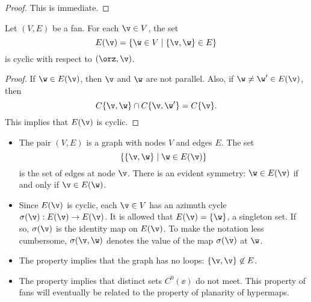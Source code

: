 \begin{proof} This is immediate.
\end{proof}

\begin{lemma}  
Let $(V,E)$ be a fan.
For each $\v\in V$, the set
\begin{displaymath}
E(\v) = \{\w\in V\mid \{\v,\w\}\in E\}
\end{displaymath}
is cyclic with respect to $(\orz,\v)$.
\end{lemma}
%

\begin{proof}  If $\w\in E(\v)$, then $\v$ and $\w$ are not parallel.
Also, if $\w\ne \w'\in E(\v)$, then
\begin{displaymath}
C\{\v,\w\}\cap C\{\v,\w'\} = C\{\v\}.
\end{displaymath}
This implies that $E(\v)$ is cyclic.
\end{proof}

\begin{remark}\label{rem:fan}
\begin{itemize}
\item The pair $(V,E)$ is a graph with nodes $V$ and edges $E$.  The set
\begin{displaymath}\{\{\v,\w\}\mid \w\in E(\v)\}\end{displaymath} is
the set of edges at node $\v$.  There is an evident symmetry: $\w\in
E(\v)$ if and only if $\v\in E(\w)$.
%
\item
{}
Since $E(\v)$ is cyclic,
each $\v\in V$ has an azimuth cycle $\sigma(\v):E(\v)\to E(\v)$.
It is allowed that $E(\v) = \{\w\}$,  a
%
singleton set. If so,
$\sigma(\v)$ is the identity map on $E(\v)$.
%
To make the notation less cumbersome, $\sigma(\v,\w)$ denotes the
value of the map $\sigma(\v)$ at $\w$.
%
\item The property  implies that the graph has no
loops: $\{\v,\v\}\not\in E$.
%
\item The property  implies that distinct sets
$C^0(\ee)$ do not meet.  This property of fans will eventually be
related to the property of planarity of hypermaps.
%
%
%
%
\end{itemize}
\end{remark}

